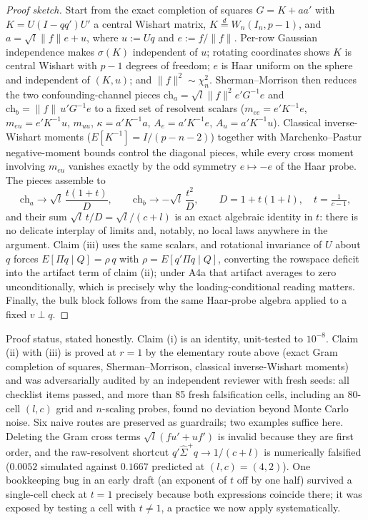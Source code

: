 \begin{proof}[Proof sketch]
Start from the exact completion of squares $G=K+aa'$ with $K=U(I-qq')U'$ a central Wishart matrix, $K\stackrel{d}{=}W_n(I_n,p-1)$, and $a=\sqrt{l}\|f\|e+u$, where $u:=Uq$ and $e:=f/\|f\|$. Per-row Gaussian independence makes $\sigma(K)$ independent of $u$; rotating coordinates shows $K$ is central Wishart with $p-1$ degrees of freedom; $e$ is Haar uniform on the sphere and independent of $(K,u)$; and $\|f\|^2\sim\chi_n^2$. Sherman--Morrison then reduces the two confounding-channel pieces $\mathrm{ch}_a=\sqrt{l}\|f\|^2 e'G^{-1}e$ and $\mathrm{ch}_b=\|f\|\,u'G^{-1}e$ to a fixed set of resolvent scalars ($m_{ee}=e'K^{-1}e$, $m_{eu}=e'K^{-1}u$, $m_{uu}$, $\kappa=a'K^{-1}a$, $A_e=a'K^{-1}e$, $A_u=a'K^{-1}u$). Classical inverse-Wishart moments ($E[K^{-1}]=I/(p-n-2)$) together with Marchenko--Pastur negative-moment bounds control the diagonal pieces, while every cross moment involving $m_{eu}$ vanishes exactly by the odd symmetry $e\mapsto -e$ of the Haar probe. The pieces assemble to
\[
\mathrm{ch}_a\to\sqrt{l}\,\frac{t(1+t)}{D},\qquad
\mathrm{ch}_b\to-\sqrt{l}\,\frac{t^{2}}{D},\qquad
D=1+t(1+l),\quad t=\tfrac{1}{c-1},
\]
and their sum $\sqrt{l}\,t/D=\sqrt{l}/(c+l)$ is an exact algebraic identity in $t$: there is no delicate interplay of limits and, notably, no local laws anywhere in the argument. Claim (iii) uses the same scalars, and rotational invariance of $U$ about $q$ forces $E[\Pi q\mid Q]=\rho\,q$ with $\rho=E[q'\Pi q\mid Q]$, converting the rowspace deficit into the artifact term of claim (ii); under A4a that artifact averages to zero unconditionally, which is precisely why the loading-conditional reading matters. Finally, the bulk block follows from the same Haar-probe algebra applied to a fixed $v\perp q$.
\end{proof}

Proof status, stated honestly. Claim (i) is an identity, unit-tested to $10^{-8}$. Claim (ii) with (iii) is proved at $r=1$ by the elementary route above (exact Gram completion of squares, Sherman--Morrison, classical inverse-Wishart moments) and was adversarially audited by an independent reviewer with fresh seeds: all checklist items passed, and more than 85 fresh falsification cells, including an 80-cell $(l,c)$ grid and $n$-scaling probes, found no deviation beyond Monte Carlo noise. Six naive routes are preserved as guardrails; two examples suffice here. Deleting the Gram cross terms $\sqrt{l}(fu'+uf')$ is invalid because they are first order, and the raw-resolvent shortcut $q'\hat\Sigma^{+}q\to 1/(c+l)$ is numerically falsified ($0.0052$ simulated against $0.1667$ predicted at $(l,c)=(4,2)$). One bookkeeping bug in an early draft (an exponent of $t$ off by one half) survived a single-cell check at $t=1$ precisely because both expressions coincide there; it was exposed by testing a cell with $t\ne 1$, a practice we now apply systematically.

